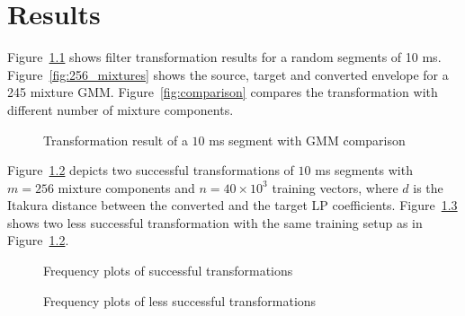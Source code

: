 \chapter{Results} %
\label{cha:results}
Figure~\ref{fig:frequency_plots_1} shows filter transformation results for a random segments of 10 ms. Figure~\ref{fig:256_mixtures} shows the source, target and converted envelope for a 245 mixture GMM. Figure~\ref{fig:comparison} compares the transformation with different number of mixture components.
\begin{figure}[htbp]
	\begin{center}
	\caption{Transformation result of a $10$ ms segment with GMM comparison}
	\label{fig:frequency_plots_1}
	\end{center}
\end{figure}

Figure~\ref{fig:frequency_plots_2} depicts two successful transformations of $10$ ms segments with $m=256$ mixture components and $n=40\times 10^3$ training vectors, where $d$ is the Itakura distance between the converted and the target LP coefficients. Figure~\ref{fig:frequency_plots_3} shows two less successful transformation with the same training setup as in Figure~\ref{fig:frequency_plots_2}.
\begin{figure}[htbp]
	\begin{center}
	\caption{Frequency plots of successful transformations}
	\label{fig:frequency_plots_2}
	\end{center}
\end{figure}
\begin{figure}[htbp]
	\begin{center}
	\caption{Frequency plots of less successful transformations}
	\label{fig:frequency_plots_3}
	\end{center}
\end{figure}



